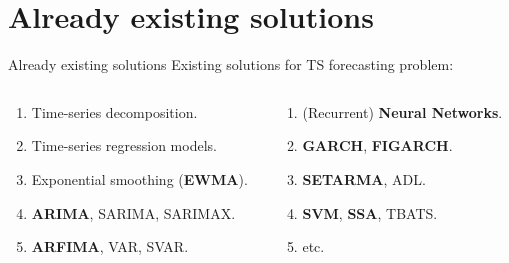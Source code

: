 \documentclass[aspectratio= 169]{beamer}
\begin{document}
	\section{Already existing solutions}
	\begin{frame}{Already existing solutions}
		Existing solutions for TS forecasting problem:
		
		\begin{columns}[T]
			\begin{column}{0.5\textwidth}
				\begin{enumerate}
					\item Time-series decomposition.
					\item Time-series regression models.
					\item Exponential smoothing (\textbf{EWMA}).
					\item \textbf{ARIMA}, SARIMA, SARIMAX.
					\item \textbf{ARFIMA}, VAR, SVAR.
				\end{enumerate}
			\end{column}
			\hfill
			\begin{column}{0.5\textwidth}
				\begin{enumerate}
					\item (Recurrent) \textbf{Neural Networks}.
					\item \textbf{GARCH}, \textbf{FIGARCH}.
					\item \textbf{SETARMA}, ADL.
					\item \textbf{SVM}, \textbf{SSA}, TBATS.
					\item[] etc.
				\end{enumerate}
			\end{column}
		\end{columns}

	\end{frame}
\end{document}
